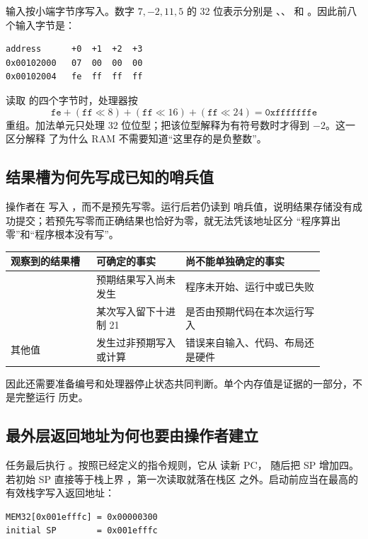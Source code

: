 输入按小端字节序写入。数字 \(7,-2,11,5\) 的 32 位表示分别是
、、 和
。因此前八个输入字节是：

\begin{lstlisting}
address      +0  +1  +2  +3
0x00102000   07  00  00  00
0x00102004   fe  ff  ff  ff
\end{lstlisting}

读取  的四个字节时，处理器按
\[
\texttt{fe}+(\texttt{ff}\ll 8)+(\texttt{ff}\ll16)+(\texttt{ff}\ll24)
=\texttt{0xfffffffe}
\]
重组。加法单元只处理 32 位位型；把该位型解释为有符号数时才得到 \(-2\)。这一区分解释
了为什么 RAM 不需要知道“这里存的是负整数”。

\subsection{结果槽为何先写成已知的哨兵值}

操作者在  写入 ，而不是预先写零。运行后若仍读到
哨兵值，说明结果存储没有成功提交；若预先写零而正确结果也恰好为零，就无法凭该地址区分
“程序算出零”和“程序根本没有写”。

\begin{longtable}{|L{0.24\linewidth}|L{0.25\linewidth}|L{0.39\linewidth}|}
\hline
{}
观察到的结果槽 & 可确定的事实 & 尚不能单独确定的事实 \\ \hline
{} & 预期结果写入尚未发生 & 程序未开始、运行中或已失败 \\ \hline
{} & 某次写入留下十进制 21 & 是否由预期代码在本次运行写入 \\ \hline
其他值 & 发生过非预期写入或计算 & 错误来自输入、代码、布局还是硬件 \\ \hline
\end{longtable}

因此还需要准备编号和处理器停止状态共同判断。单个内存值是证据的一部分，不是完整运行
历史。

\subsection{最外层返回地址为何也要由操作者建立}

任务最后执行 。按照已经定义的指令规则，它从  读新 PC，
随后把 SP 增加四。若初始 SP 直接等于栈上界 ，第一次读取就落在栈区
之外。启动前应当在最高的有效栈字写入返回地址：

\begin{lstlisting}
MEM32[0x001efffc] = 0x00000300
initial SP        = 0x001efffc
\end{lstlisting}

